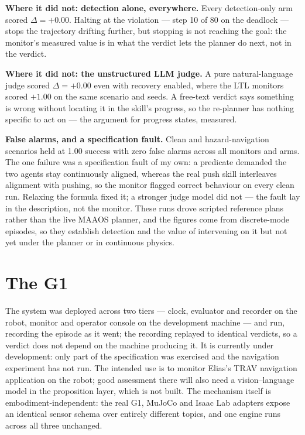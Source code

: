 \documentclass[11pt,a4paper]{article}
\begin{document}
\textbf{Where it did not: detection alone, everywhere.} Every detection-only arm scored
$\Delta = +0.00$. Halting at the violation --- step 10 of 80 on the deadlock --- stops the
trajectory drifting further, but stopping is not reaching the goal: the monitor's measured
value is in what the verdict lets the planner do next, not in the verdict.

\textbf{Where it did not: the unstructured LLM judge.} A pure natural-language judge scored
$\Delta = +0.00$ even with recovery enabled, where the LTL monitors scored $+1.00$ on the
same scenario and seeds. A free-text verdict says something is wrong without locating it in
the skill's progress, so the re-planner has nothing specific to act on --- the argument for
progress states, measured.

\textbf{False alarms, and a specification fault.} Clean and hazard-navigation scenarios held
at 1.00 success with zero false alarms across all monitors and arms. The one failure was a
specification fault of my own: a predicate demanded the two agents stay continuously aligned,
whereas the real push skill interleaves alignment with pushing, so the monitor flagged
correct behaviour on every clean run. Relaxing the formula fixed it; a stronger judge model
did not --- the fault lay in the description, not the monitor. These runs drove scripted
reference plans rather than the live MAAOS planner, and the figures come from discrete-mode
episodes, so they establish detection and the value of intervening on it but not yet under
the planner or in continuous physics.

\section{The G1}

The system was deployed across two tiers --- clock, evaluator and recorder on the robot,
monitor and operator console on the development machine --- and run, recording the episode as
it went; the recording replayed to identical verdicts, so a verdict does not depend on the
machine producing it. It is currently under development: only part of the specification was
exercised and the navigation experiment has not run. The intended use is to monitor Elias's
TRAV navigation application on the robot; good assessment there will also need a
vision--language model in the proposition layer, which is not built. The mechanism itself is
embodiment-independent: the real G1, MuJoCo and Isaac Lab adapters expose an identical sensor
schema over entirely different topics, and one engine runs across all three unchanged.
\end{document}
